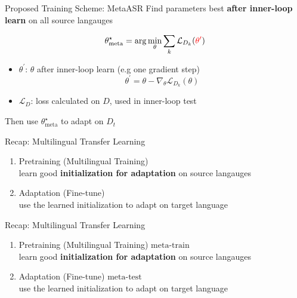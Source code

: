 \documentclass{beamer}
\begin{document}
\begin{frame}{Proposed Training Scheme: MetaASR}
  Find parameters best \textbf{after inner-loop learn} on all source langauges

  \begin{equation*}
    \theta_{\text{meta}}^\star = \arg \min_\theta \sum_k \mathcal{L}_{D_k}(\textcolor{red}{\theta^\prime})
  \end{equation*}
  \begin{itemize}
    \item $\theta^\prime$: $\theta$ after inner-loop learn (e.g one gradient step)
    \begin{equation*}
      \theta^\prime = \theta - \nabla_\theta \mathcal{L}_{D_k}(\theta)
    \end{equation*}
    \item $\mathcal{L}_D$: loss calculated on $D$, used in inner-loop test
  \end{itemize}
  
  Then use $\theta^\star_{\text{meta}}$ to adapt on $D_t$
  
\end{frame}

\begin{frame}[t]{Recap: Multilingual Transfer Learning}

  \begin{enumerate}
    \item Pretraining (Multilingual Training) \\ learn good \textbf{initialization for adaptation} on source langauges
    \item Adaptation (Fine-tune) \\ use the learned initialization to adapt on target language
  \end{enumerate}
\end{frame}
\begin{frame}[t]{Recap: Multilingual Transfer Learning}

  \begin{enumerate}
    \item Pretraining (Multilingual Training) $\boxed{\text{meta-train}}$ \\ learn good \textbf{initialization for adaptation} on source langauges
    \item Adaptation (Fine-tune) $\boxed{\text{meta-test}}$ \\ use the learned initialization to adapt on target language
  \end{enumerate}
\end{frame}
\end{document}
